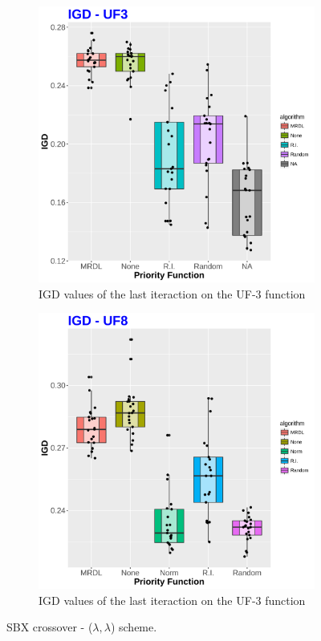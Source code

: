 \begin{figure}[!t]

	\begin{subfigure}[b]{0.49\textwidth}
		\centering
		\includegraphics[width=1\textwidth, height=0.7\textwidth]{images/UF3_IGD}
		\caption{IGD values of the last iteraction on the UF-3 function}
	\end{subfigure}
	\begin{subfigure}[b]{0.49\textwidth}
		\centering
		\includegraphics[width=1\textwidth, height=0.7\textwidth]{images/UF8_IGD}
		\caption{IGD values of the last iteraction on the UF-3 function}
	\end{subfigure}
	\caption{SBX crossover - ($\lambda, \lambda$) scheme.}
		\label{IGDS}
\end{figure}



